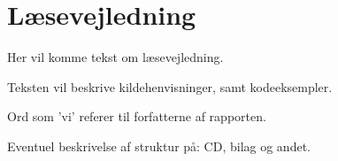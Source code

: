 \chapter{Læsevejledning}
Her vil komme tekst om læsevejledning.

Teksten vil beskrive kildehenvisninger, samt kodeeksempler.

Ord som 'vi' referer til forfatterne af rapporten.

 Eventuel beskrivelse af struktur på: CD, bilag og andet.
